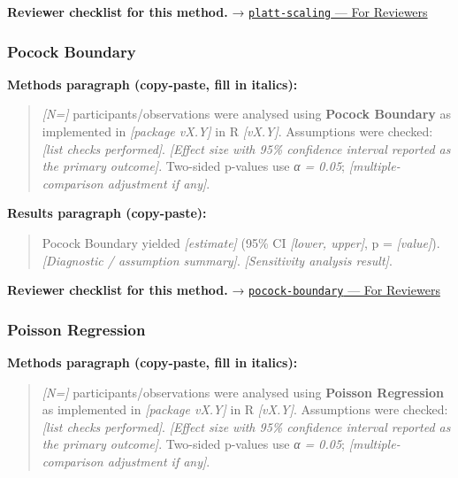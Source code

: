 \documentclass[
]{article}
\begin{document}
\textbf{Reviewer checklist for this method.} →
\href{../chapters/13-ml/platt-scaling.Rmd\#for-reviewers}{\texttt{platt-scaling}
--- For Reviewers}

\subsubsection{Pocock Boundary}\label{pocock-boundary}

\textbf{Methods paragraph (copy-paste, fill in italics):}

\begin{quote}
\emph{{[}N={]}} participants/observations were analysed using
\textbf{Pocock Boundary} as implemented in \emph{{[}package vX.Y{]}} in
R \emph{{[}vX.Y{]}}. Assumptions were checked: \emph{{[}list checks
performed{]}}. \emph{{[}Effect size with 95\% confidence interval
reported as the primary outcome{]}}. Two-sided p-values use \emph{α =
0.05}; \emph{{[}multiple-comparison adjustment if any{]}}.
\end{quote}

\textbf{Results paragraph (copy-paste):}

\begin{quote}
Pocock Boundary yielded \emph{{[}estimate{]}} (95\% CI \emph{{[}lower,
upper{]}}, p = \emph{{[}value{]}}). \emph{{[}Diagnostic / assumption
summary{]}}. \emph{{[}Sensitivity analysis result{]}}.
\end{quote}

\textbf{Reviewer checklist for this method.} →
\href{../chapters/14-clinical/pocock-boundary.Rmd\#for-reviewers}{\texttt{pocock-boundary}
--- For Reviewers}

\subsubsection{Poisson Regression}\label{poisson-regression}

\textbf{Methods paragraph (copy-paste, fill in italics):}

\begin{quote}
\emph{{[}N={]}} participants/observations were analysed using
\textbf{Poisson Regression} as implemented in \emph{{[}package vX.Y{]}}
in R \emph{{[}vX.Y{]}}. Assumptions were checked: \emph{{[}list checks
performed{]}}. \emph{{[}Effect size with 95\% confidence interval
reported as the primary outcome{]}}. Two-sided p-values use \emph{α =
0.05}; \emph{{[}multiple-comparison adjustment if any{]}}.
\end{quote}
\end{document}
